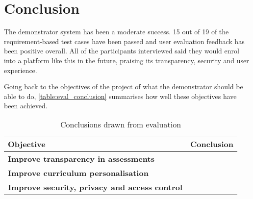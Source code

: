 \section{Conclusion}

The demonstrator system has been a moderate success. 15 out of 19 of the requirement-based test cases have been passed and
user evaluation feedback has been positive overall.
All of the participants interviewed said they would enrol into a platform like this in the future,
praising its transparency, security and user experience.

Going back to the objectives of the project of what the demonstrator should be able to do,
\ref{table:eval_conclusion} summarises how well these objectives have been achieved.

\begin{table}[!ht]
	\caption{Conclusions drawn from evaluation}
	\label{eval_conclusion}
	\begin{tabularx}{\textwidth}{|>{\bfseries}X|X|}
		\hline
		Objective & Conclusion
		\\\hline
		Improve transparency in assessments &
		\\\hline
		Improve curriculum personalisation &
		\\\hline	
		Improve security, privacy and access control &
		\\\hline
	\end{tabularx}
\end{table}




